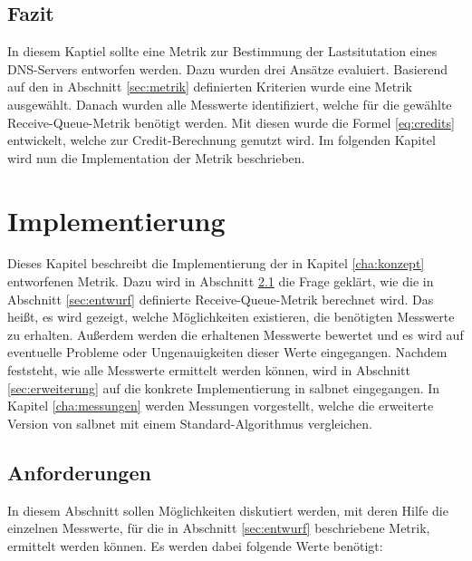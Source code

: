 \documentclass[a4paper, 12pt, BCOR10mm, DIV12, toc=bibliography, toc=listof, german]{scrbook}
\begin{document}

		\section{Fazit} %
		\label{sec:konzept-fazit}

		In diesem Kaptiel sollte eine Metrik zur Bestimmung der Lastsitutation eines DNS-Servers
		entworfen werden. Dazu wurden drei Ansätze evaluiert. Basierend auf den in Abschnitt \ref{sec:metrik}
		definierten Kriterien wurde eine Metrik ausgewählt. Danach wurden alle Messwerte
		identifiziert, welche für die gewählte Receive-Queue-Metrik benötigt werden. Mit diesen wurde
		die Formel \ref{eq:credits} entwickelt, welche zur Credit-Berechnung genutzt wird. Im folgenden
		Kapitel wird nun die Implementation der Metrik beschrieben.



	\chapter{Implementierung} %
	\label{cha:implementierung}

	Dieses Kapitel beschreibt die Implementierung der in Kapitel \ref{cha:konzept} entworfenen Metrik.
	Dazu wird in Abschnitt \ref{sec:anforderungen} die Frage geklärt, wie die in Abschnitt
	\ref{sec:entwurf} definierte Receive-Queue-Metrik berechnet wird. Das heißt, es wird gezeigt, welche
	Möglichkeiten existieren, die benötigten Messwerte zu erhalten. Außerdem werden die erhaltenen
	Messwerte bewertet und es wird auf eventuelle Probleme oder Ungenauigkeiten dieser Werte
	eingegangen. Nachdem feststeht, wie alle Messwerte ermittelt werden können, wird in Abschnitt
	\ref{sec:erweiterung} auf die konkrete Implementierung in salbnet eingegangen. In Kapitel
	\ref{cha:messungen} werden Messungen vorgestellt, welche die erweiterte Version von salbnet mit
	einem Standard-Algorithmus vergleichen.

		\section{Anforderungen} %
		\label{sec:anforderungen}

		In diesem Abschnitt sollen Möglichkeiten diskutiert werden, mit deren Hilfe die einzelnen
		Messwerte, für die in Abschnitt \ref{sec:entwurf} beschriebene Metrik, ermittelt werden können. Es
		werden dabei folgende Werte benötigt: $~$\\
		
\end{document}
